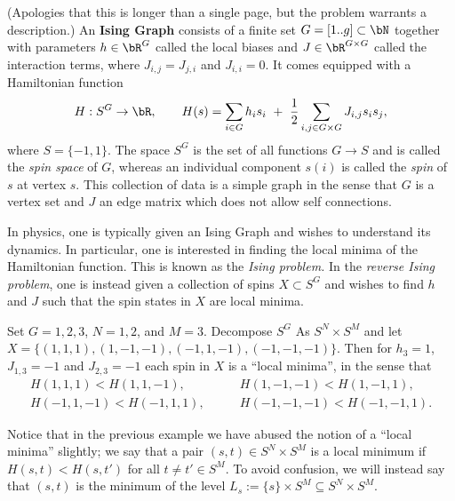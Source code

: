 \begin{homework}[e]
  \newpage
{} (Apologies that this is longer than a single page, but the problem warrants a description.) An \textbf{Ising Graph} consists of a finite set $G = [1..g]\subset \bN$ together with parameters $h \in \bR^G$ called the local biases and $J \in \bR^{G\times G}$ called the interaction terms, where $J_{i,j} = J_{j,i}$ and $J_{i,i} = 0$. It comes equipped with a Hamiltonian function
  \begin{align*}
    H:S^G \to \bR, \hspace{2em} H(s) = \sum_{i\in G} h_is_i ~+~ \frac{1}{2}\sum_{i,j\in G\times G} J_{i,j}s_is_j,
  \end{align*}
  where $S = \{-1,1\}$. The space $S^G$ is the set of all functions $G\to S$ and is called the \emph{spin space} of $G$, whereas an individual component $s(i)$ is called the \emph{spin} of $s$ at vertex $s$. This collection of data is a simple graph in the sense that $G$ is a vertex set and $J$ an edge matrix which does not allow self connections.

  In physics, one is typically given an Ising Graph and wishes to understand its dynamics. In particular, one is interested in finding the local minima of the Hamiltonian function. This is known as the \emph{Ising problem.} In the \emph{reverse Ising problem}, one is instead given a collection of spins $X\subset S^G$ and wishes to find $h$ and $J$ such that the spin states in $X$ are local minima.

  \begin{example}
    Set $G = {1,2,3}$, $N = {1,2}$, and $M = {3}$. Decompose $S^G$ As $S^N\times S^M$ and let $X = \{(1,1,1), (1,-1,-1), (-1,1,-1), (-1,-1,-1)\}$. Then for $h_3 = 1$, $J_{1,3} = -1$ and $J_{2,3} = -1$ each spin in $X$ is a ``local minima'', in the sense that
    \begin{align*}
      H(1,1,1) < H(1,1,-1), &\hspace{2em} H(1,-1,-1) < H(1, -1, 1), \\
      H(-1,1,-1) < H(-1, 1, 1), &\hspace{2em}H(-1,-1,-1) < H(-1, -1, 1).
    \end{align*}
  \end{example}
  Notice that in the previous example we have abused the notion of a ``local minima'' slightly; we say that a pair $(s,t) \in S^N\times S^M$ is a local minimum if $H(s,t) < H(s,t')$ for all $t \neq t' \in S^M$. To avoid confusion, we will instead say that $(s,t)$ is the minimum of the level $L_s := \{s\}\times S^M \subseteq S^N\times S^M$.


\end{homework}
